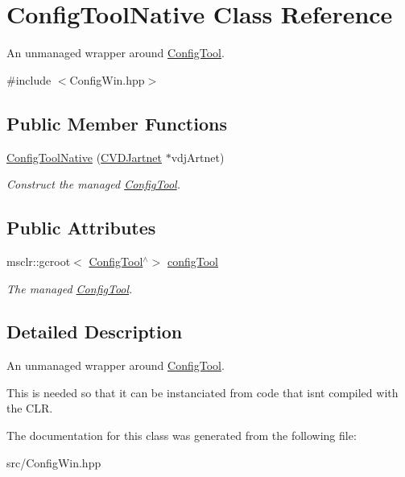 \hypertarget{classConfigToolNative}{}\section{Config\+Tool\+Native Class Reference}
\label{classConfigToolNative}


An unmanaged wrapper around \hyperlink{interfaceConfigTool}{Config\+Tool}.  




{\ttfamily \#include $<$Config\+Win.\+hpp$>$}

\subsection*{Public Member Functions}
\begin{DoxyCompactItemize}
\item 
\mbox{\label{classConfigToolNative_a134b413ca0aefbc16d24d1c104bb620d}} 
\hyperlink{classConfigToolNative_a134b413ca0aefbc16d24d1c104bb620d}{Config\+Tool\+Native} (\hyperlink{classCVDJartnet}{C\+V\+D\+Jartnet} $\ast$vdj\+Artnet)
\begin{DoxyCompactList}\small\item\em Construct the managed \hyperlink{interfaceConfigTool}{Config\+Tool}. \end{DoxyCompactList}\end{DoxyCompactItemize}
\subsection*{Public Attributes}
\begin{DoxyCompactItemize}
\item 
\mbox{\label{classConfigToolNative_a684f575b9597f99a7246fba50a7641d8}} 
msclr\+::gcroot$<$ \hyperlink{interfaceConfigTool}{Config\+Tool}$^\wedge$$>$ \hyperlink{classConfigToolNative_a684f575b9597f99a7246fba50a7641d8}{config\+Tool}
\begin{DoxyCompactList}\small\item\em The managed \hyperlink{interfaceConfigTool}{Config\+Tool}. \end{DoxyCompactList}\end{DoxyCompactItemize}


\subsection{Detailed Description}
An unmanaged wrapper around \hyperlink{interfaceConfigTool}{Config\+Tool}. 

This is needed so that it can be instanciated from code that isn\textquotesingle{}t compiled with the C\+LR. 

The documentation for this class was generated from the following file\+:\begin{DoxyCompactItemize}
\item 
src/Config\+Win.\+hpp\end{DoxyCompactItemize}
